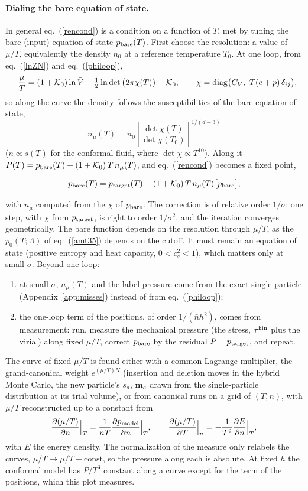 \documentclass[11pt,aps,preprint,nofootinbib,superscriptaddress,tightenlines]{revtex4-2}
\def\st{\begin{equation}}
\def\stp{\end{equation}}
\def\Eq#1{eq.~(\ref{#1})}
\def\App#1{Appendix~\ref{#1}}
\let\oldparagraph\paragraph
\renewcommand{\paragraph}{\par\bigskip\oldparagraph}
\begin{document}
\paragraph{Dialing the bare equation of state.}  In general \Eq{rencond} is a condition on a function of $T$, met by tuning the bare (input) equation
of state $p_{\rm bare}(T)$.  First choose the resolution: a value of $\mu/T$, equivalently the density $n_0$ at a reference temperature $T_0$.  At one loop,
from \Eq{lnZN} and \Eq{philoop},
\st
-\frac\mu T=(1+\mathcal K_0)\ln\bar V+\tfrac12\ln\det\big(2\pi\chi(T)\big)-\mathcal K_0,\qquad \chi={\rm diag}\big(C_V,\ T(e+p)\,\delta_{ij}\big),
\stp
so along the curve the density follows the susceptibilities of the bare equation of state,
\st
n_\mu(T)=n_0\left[\frac{\det\chi(T)}{\det\chi(T_0)}\right]^{1/(d+3)}
\stp
($n\propto s(T)$ for the conformal fluid, where $\det\chi\propto T^{10}$).  Along it $P(T)=p_{\rm bare}(T)+(1+\mathcal K_0)\,T\,n_\mu(T)$, and \Eq{rencond} becomes a fixed point,
\begin{keyeq}
\st
p_{\rm bare}(T)=p_{\rm target}(T)-(1+\mathcal K_0)\,T\,n_\mu(T)\big[p_{\rm bare}\big],
\label{pbare}
\stp
\end{keyeq}
with $n_\mu$ computed from the $\chi$ of $p_{\rm bare}$.  The correction is of relative order $1/\sigma$: one step, with $\chi$ from $p_{\rm target}$, is right to order
$1/\sigma^2$, and the iteration converges geometrically.  The bare function depends on the resolution through $\mu/T$, as the $p_0(T;\Lambda)$ of
\Eq{amt35} depends on the cutoff.  It must remain an equation of state (positive entropy and heat capacity, $0<c_s^2<1$), which matters only at small
$\sigma$.  Beyond one loop:
\begin{enumerate}
\item at small $\sigma$, $n_\mu(T)$ and the label pressure come from the exact single particle (\App{app:misses}) instead of from \Eq{philoop};
\item the one-loop term of the positions, of order $1/(\bar nh^2)$, comes from measurement: run, measure the mechanical pressure (the stress, $\tau^{\rm kin}$ plus
  the virial) along fixed $\mu/T$, correct $p_{\rm bare}$ by the residual $P-p_{\rm target}$, and repeat.
\end{enumerate}
The curve of fixed $\mu/T$ is found either with a common Lagrange multiplier, the grand-canonical weight $e^{(\mu/T)N}$ (insertion and deletion moves in the hybrid
Monte Carlo, the new particle's $s_a$, $\bm m_a$ drawn from the single-particle distribution at its trial volume), or from canonical runs on a grid of $(T,n)$, with
$\mu/T$ reconstructed up to a constant from
\st
\frac{\partial(\mu/T)}{\partial n}\Big|_T=\frac1{nT}\frac{\partial p_{\rm model}}{\partial n}\Big|_T,\qquad
\frac{\partial(\mu/T)}{\partial T}\Big|_n=-\frac1{T^2}\frac{\partial E}{\partial n}\Big|_T ,
\stp
with $E$ the energy density.  The normalization of the measure only relabels the curves, $\mu/T\to\mu/T+\text{const}$, so the pressure along each is absolute.
At fixed $h$ the conformal model has $P/T^3$ constant along a curve except for the term of the positions, which this plot measures.
\end{document}
